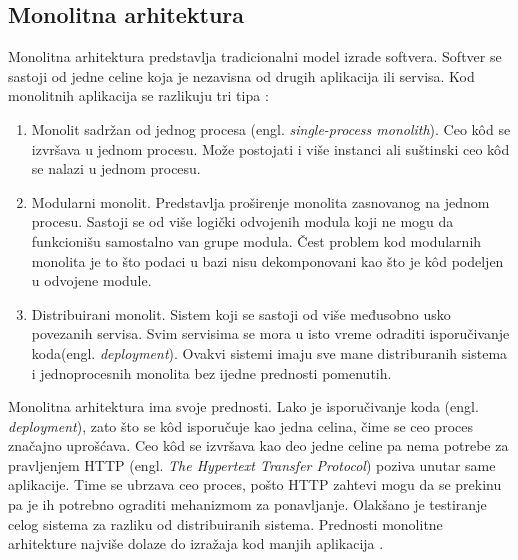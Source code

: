 \documentclass[12pt,oneside]{memoir}
\begin{document}
\subsection{Monolitna arhitektura}
Monolitna arhitektura predstavlja tradicionalni model izrade softvera. Softver se sastoji od jedne celine koja je nezavisna od drugih aplikacija ili servisa. Kod monolitnih aplikacija se razlikuju tri tipa \cite{bm}:
\begin{enumerate}
  \item Monolit sadržan od jednog procesa (engl. \emph{single-process monolith}). Ceo kôd se izvršava u jednom procesu. Može postojati i više instanci ali suštinski ceo kôd se nalazi u jednom procesu. 
  \item Modularni monolit. Predstavlja proširenje monolita zasnovanog na jednom procesu. Sastoji se od više logički odvojenih modula koji ne mogu da funkcionišu samostalno van grupe modula. Čest problem kod modularnih monolita je to što podaci u bazi nisu dekomponovani kao što je kôd podeljen u odvojene module.
  \item Distribuirani monolit. Sistem koji se sastoji od više međusobno usko povezanih servisa. Svim servisima se mora u isto vreme odraditi isporučivanje koda(engl. \emph{deployment}). Ovakvi sistemi imaju sve mane distriburanih sistema i jednoprocesnih monolita bez ijedne prednosti pomenutih.
\end{enumerate}

Monolitna arhitektura ima svoje prednosti. Lako je isporučivanje koda (engl. \emph{deployment}), zato što se kôd isporučuje kao jedna celina, čime se ceo proces značajno uprošćava. Ceo kôd se izvršava kao deo jedne celine pa nema potrebe za pravljenjem HTTP (engl. \emph{The Hypertext Transfer Protocol}) poziva unutar same aplikacije. Time se ubrzava ceo proces, pošto HTTP zahtevi mogu da se prekinu pa je ih potrebno ograditi mehanizmom za ponavljanje. Olakšano je testiranje celog sistema za razliku od distribuiranih sistema. Prednosti monolitne arhitekture najviše dolaze do izražaja kod manjih aplikacija \cite{bm}.
\end{document}

